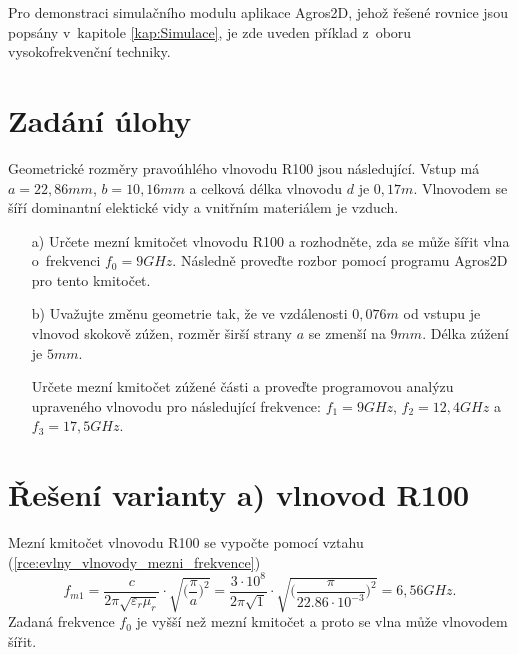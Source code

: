 
Pro demonstraci simulačního modulu aplikace Agros2D, jehož řešené rovnice jsou popsány v~kapitole \ref{kap:Simulace}, je zde uveden příklad z~oboru vysokofrekvenční techniky. 

\section{Zadání úlohy}
Geometrické rozměry pravoúhlého vlnovodu R100 \cite{R100} jsou následující. Vstup má $a = 22,86 \unit{mm}$, $b = 10,16 \unit{mm}$ a celková délka vlnovodu $d$ je $0,17 \unit{m}$. Vlnovodem se šíří dominantní elektické vidy a vnitřním materiálem je vzduch. 
\begin{enumerate}
\item[a)] Určete mezní kmitočet vlnovodu R100 a rozhodněte, zda se může šířit vlna o~frekvenci $f_0 = 9 \unit{GHz}$. Následně proveďte rozbor pomocí programu Agros2D pro tento kmitočet. 
\item[b)] Uvažujte změnu geometrie tak, že ve vzdálenosti $0,076 \unit{m}$ od vstupu je vlnovod skokově zúžen, rozměr širší strany $a$ se zmenší na $9 \unit {mm}$. Délka zúžení je $5 \unit{mm}$. 

Určete mezní kmitočet zúžené části a proveďte programovou analýzu upraveného vlnovodu pro následující frekvence:  $f_1 = 9 \unit{GHz}$, $f_2 = 12,4 \unit{GHz}$ a $f_3 = 17,5 \unit{GHz}$.
\end{enumerate}

\section{Řešení varianty a) vlnovod R100}
Mezní kmitočet vlnovodu R100 se vypočte pomocí vztahu (\ref{rce:evlny_vlnovody_mezni_frekvence})
\begin{displaymath}
f_{m1} = \frac{c}{2\pi\sqrt{\varepsilon_{r}\mu_{r}}}\cdot\sqrt{\bigg(\frac{\pi}{a}\bigg)^{2}} = \frac{3\cdot 10^{8}}{2\pi\sqrt{1}}\cdot\sqrt{\bigg(\frac{\pi}{22.86\cdot 10^{-3}}\bigg)^{2}} = 6,56 \unit{GHz}.
\end{displaymath}
Zadaná frekvence $f_0$ je vyšší než mezní kmitočet a proto se vlna může vlnovodem šířit.

